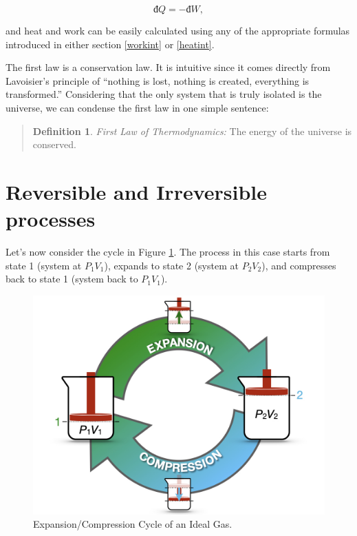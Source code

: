\documentclass[
  9pt,
]{extbook}
\theoremstyle{definition}
\newtheorem{definition}{Definition}[chapter]
\theoremstyle{definition}
\theoremstyle{definition}
\theoremstyle{remark}
\begin{document}
\begin{equation}
  đ Q = -đ W,
  \label{eq:heateqwork}
\end{equation}

and heat and work can be easily calculated using any of the appropriate formulas introduced in either section \ref{workint} or \ref{heatint}.

The first law is a conservation law. It is intuitive since it comes directly from Lavoisier's principle of ``nothing is lost, nothing is created, everything is transformed.'' Considering that the only system that is truly isolated is the universe, we can condense the first law in one simple sentence:

\begin{quote}
\begin{definition}
\protect\hypertarget{def:firstlaw}{}{\label{def:firstlaw} }\emph{First Law of Thermodynamics:} The energy of the universe is conserved.
\end{definition}
\end{quote}

\hypertarget{reversible-and-irreversible-processes}{%
\section{Reversible and Irreversible processes}\label{reversible-and-irreversible-processes}}

Let's now consider the cycle in Figure \ref{fig:FigRevCyc}. The process in this case starts from state 1 (system at \(P_1V_1\)), expands to state 2 (system at \(P_2V_2\)), and compresses back to state 1 (system back to \(P_1V_1\)).

\begin{figure}

{\centering \includegraphics[width=0.8\linewidth]{./img/OEP_Figures.005} 

}

\caption{Expansion/Compression Cycle of an Ideal Gas.}\label{fig:FigRevCyc}
\end{figure}
\end{document}
